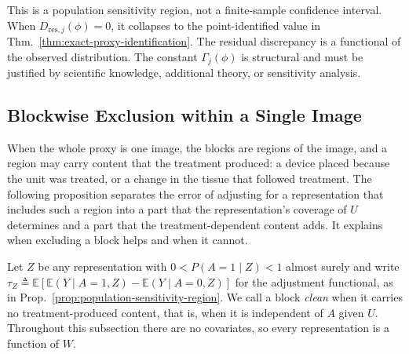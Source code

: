 This is a population sensitivity region, not a finite-sample confidence interval. When $D_{\mathrm{res},j}(\phi)=0$, it collapses to the point-identified value in Thm.~\ref{thm:exact-proxy-identification}. The residual discrepancy is a functional of the observed distribution.
The constant $\Gamma_j(\phi)$ is structural and must be justified by scientific knowledge, additional theory, or sensitivity analysis.

\subsection{Blockwise Exclusion within a Single Image}
\label{sec:single-image-decomposition}

When the whole proxy is one image, the blocks are regions of the image, and a region may carry content that the treatment produced: a device placed because the unit was treated, or a change in the tissue that followed treatment. The following proposition separates the error of adjusting for a representation that includes such a region into a part that the representation's coverage of $U$ determines and a part that the treatment-dependent content adds. It explains when excluding a block helps and when it cannot.

Let $Z$ be any representation with $0<P(A=1\mid Z)<1$ almost surely and write $\tau_Z\triangleq\mathbb E[\mathbb E(Y\mid A=1,Z)-\mathbb E(Y\mid A=0,Z)]$ for the adjustment functional, as in Prop.~\ref{prop:population-sensitivity-region}. We call a block \emph{clean} when it carries no treatment-produced content, that is, when it is independent of $A$ given $U$. Throughout this subsection there are no covariates, so every representation is a function of $W$.

